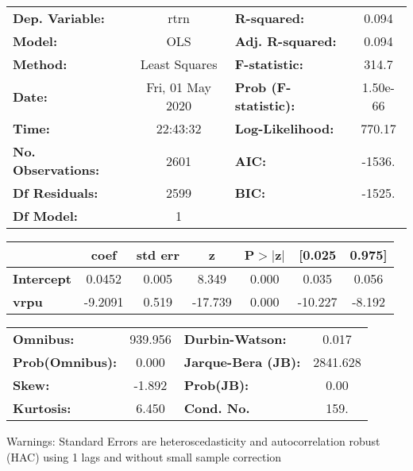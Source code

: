 \begin{center}
\begin{tabular}{lclc}
\toprule
\textbf{Dep. Variable:}    &       rtrn       & \textbf{  R-squared:         } &     0.094   \\
\textbf{Model:}            &       OLS        & \textbf{  Adj. R-squared:    } &     0.094   \\
\textbf{Method:}           &  Least Squares   & \textbf{  F-statistic:       } &     314.7   \\
\textbf{Date:}             & Fri, 01 May 2020 & \textbf{  Prob (F-statistic):} &  1.50e-66   \\
\textbf{Time:}             &     22:43:32     & \textbf{  Log-Likelihood:    } &    770.17   \\
\textbf{No. Observations:} &        2601      & \textbf{  AIC:               } &    -1536.   \\
\textbf{Df Residuals:}     &        2599      & \textbf{  BIC:               } &    -1525.   \\
\textbf{Df Model:}         &           1      & \textbf{                     } &             \\
\bottomrule
\end{tabular}
\begin{tabular}{lcccccc}
                   & \textbf{coef} & \textbf{std err} & \textbf{z} & \textbf{P$> |$z$|$} & \textbf{[0.025} & \textbf{0.975]}  \\
\midrule
\textbf{Intercept} &       0.0452  &        0.005     &     8.349  &         0.000        &        0.035    &        0.056     \\
\textbf{vrpu}      &      -9.2091  &        0.519     &   -17.739  &         0.000        &      -10.227    &       -8.192     \\
\bottomrule
\end{tabular}
\begin{tabular}{lclc}
\textbf{Omnibus:}       & 939.956 & \textbf{  Durbin-Watson:     } &    0.017  \\
\textbf{Prob(Omnibus):} &   0.000 & \textbf{  Jarque-Bera (JB):  } & 2841.628  \\
\textbf{Skew:}          &  -1.892 & \textbf{  Prob(JB):          } &     0.00  \\
\textbf{Kurtosis:}      &   6.450 & \textbf{  Cond. No.          } &     159.  \\
\bottomrule
\end{tabular}
\end{center}

Warnings: \newline
 [1] Standard Errors are heteroscedasticity and autocorrelation robust (HAC) using 1 lags and without small sample correction